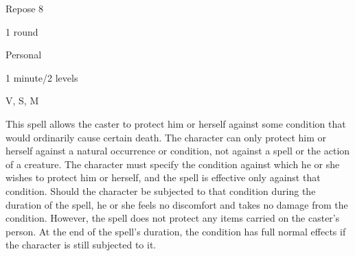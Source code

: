 
\begin{description*}
\item[Level:] Repose 8
\item[Casting Time:] 1 round
\item[Range:] Personal
\item[Duration:] 1 minute/2 levels
\item[Components:] V, S, M
\end{description*}

This spell allows the caster to protect him or herself against some condition that
would ordinarily cause certain death. The character can only protect him or herself
against a natural occurrence or condition, not against a spell or the action of
a creature. The character must specify the condition against which he or she wishes
to protect him or herself, and the spell is effective only against that condition.
Should the character be subjected to that condition during the duration of the
spell, he or she feels no discomfort and takes no damage from the condition. However,
the spell does not protect any items carried on the caster's person. At the end
of the spell's duration, the condition has full normal effects if the character
is still subjected to it.